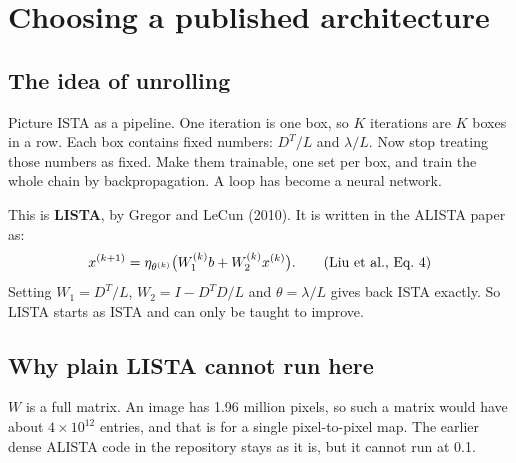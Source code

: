 \chapter{Choosing a published architecture}\label{ch:choice}

\section{The idea of unrolling}

Picture ISTA as a pipeline. One iteration is one box, so $K$ iterations are $K$ boxes in a row. Each box
contains fixed numbers: $D^T/L$ and $\lambda/L$. Now stop treating those numbers as fixed. Make them
trainable, one set per box, and train the whole chain by backpropagation. A loop has become a
neural network.

\begin{center}
\end{center}

This is \textbf{LISTA}, by Gregor and LeCun (2010). It is written in the ALISTA paper as:
\begin{equation}
x^{(k+1)} = \eta_{\theta^{(k)}}\big(W_1^{(k)} b + W_2^{(k)} x^{(k)}\big). \tag{Liu et al., Eq.~4}
\end{equation}
Setting $W_1=D^T/L$, $W_2=I-D^TD/L$ and $\theta=\lambda/L$ gives back ISTA exactly. So LISTA starts as
ISTA and can only be taught to improve.

\section{Why plain LISTA cannot run here}

$W$ is a full matrix. An image has 1.96 million pixels, so such a matrix would have about
$4\times10^{12}$ entries, and that is for a single pixel-to-pixel map. The earlier dense ALISTA code in
the repository stays as it is, but it cannot run at 0.1\um.

